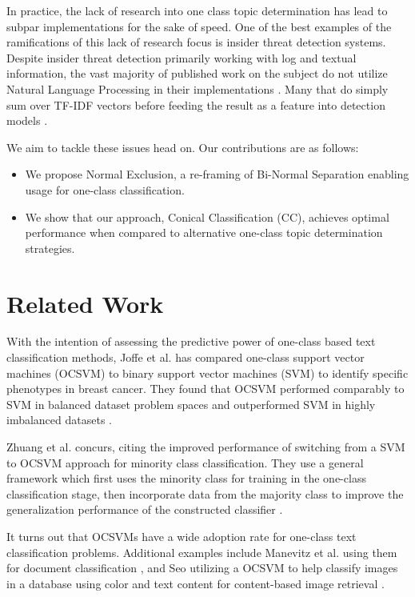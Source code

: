 \documentclass[11pt]{article}
\begin{document}
In practice, the lack of research into one class topic determination has lead to subpar implementations for the sake of speed. One of the best examples of the ramifications of this lack of research focus is insider threat detection systems. Despite insider threat detection primarily working with log and textual information, the vast majority of published work on the subject do not utilize Natural Language Processing in their implementations \cite{wei2021insider, tuor2017deep, meng2018deep, le2018benchmarking, le2019machine}. Many that do simply sum over TF-IDF vectors before feeding the result as a feature into detection models \cite{chattopadhyay2018scenario, sajjanhar2019image}.

We aim to tackle these issues head on. Our contributions are as follows:

\begin{itemize}
  \item We propose Normal Exclusion, a re-framing of Bi-Normal Separation enabling usage for one-class classification.
  \item We show that our approach, Conical Classification (CC), achieves optimal performance when compared to alternative one-class topic determination strategies.
\end{itemize}

\section{Related Work}
With the intention of assessing the predictive power of one-class based text classification methods, Joffe et al. has compared one-class support vector machines (OCSVM) to binary support vector machines (SVM) to identify specific phenotypes in breast cancer. They found that OCSVM performed comparably to SVM in balanced dataset problem spaces and outperformed SVM in highly imbalanced datasets \cite{joffe2015expert}.

Zhuang et al. concurs, citing the improved performance of switching from a SVM to OCSVM approach for minority class classification. They use a general framework which first uses the minority class for training in the one-class classification stage, then incorporate data from the majority class to improve the generalization performance of the constructed classifier \cite{zhuang2006parameter}.

It turns out that OCSVMs have a wide adoption rate for one-class text classification problems. Additional examples include Manevitz et al. using them for document classification \cite{manevitz2001one}, and Seo utilizing a OCSVM to help classify images in a database using color and text content for content-based image retrieval \cite{seo2007application}. 
\end{document}
